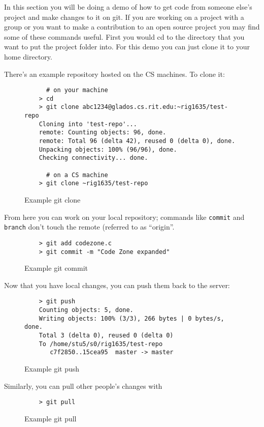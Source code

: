 \documentclass[11pt]{report}
\begin{document}
In this section you will be doing a demo of how to get code from
someone else's project and make changes to it on git. If you are
working on a project with a group or you want to make a contribution
to an open source project you may find some of these commands useful.
First you would cd to the directory that you want to put the project
folder into.  For this demo you can just clone it to your home
directory.

There's an example repository hosted on the CS machines. To clone it:

\begin{figure}[H]
  \caption{Example git clone}
  \begin{lstlisting}
      # on your machine
    > cd
    > git clone abc1234@glados.cs.rit.edu:~rig1635/test-repo
    Cloning into 'test-repo'...
    remote: Counting objects: 96, done.
    remote: Total 96 (delta 42), reused 0 (delta 0), done.
    Unpacking objects: 100% (96/96), done.
    Checking connectivity... done.

      # on a CS machine
    > git clone ~rig1635/test-repo
  \end{lstlisting}
\end{figure}

From here you can work on your local repository; commands like
\texttt{commit} and \texttt{branch} don't touch the remote (referred
to as ``origin''.

\begin{figure}[H]
  \caption{Example git commit}
  \begin{lstlisting}
    > git add codezone.c
    > git commit -m "Code Zone expanded"
  \end{lstlisting}
\end{figure}

Now that you have local changes, you can push them back to the server:

\begin{figure}[H]
  \caption{Example git push}
  \begin{lstlisting}
    > git push
    Counting objects: 5, done.
    Writing objects: 100% (3/3), 266 bytes | 0 bytes/s, done.
    Total 3 (delta 0), reused 0 (delta 0)
    To /home/stu5/s0/rig1635/test-repo
       c7f2850..15cea95  master -> master
  \end{lstlisting}
\end{figure}

Similarly, you can pull other people's changes with

\begin{figure}[H]
  \caption{Example git pull}
  \begin{lstlisting}
    > git pull
  \end{lstlisting}
\end{figure}
\end{document}
